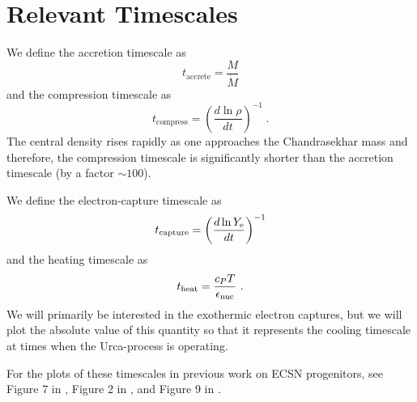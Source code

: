 \documentclass[modern]{aastex62}
\begin{document}


\section{Relevant Timescales}

We define the accretion timescale as
\begin{equation}
  t_{\mathrm{accrete}} = \frac{M}{\dot{M}}
\end{equation}
and the compression timescale as
\begin{equation}
  \label{eq:tcompress}
  t_{\mathrm{compress}} = \left(\frac{d \ln \rho}{dt} \right)^{-1}~.
\end{equation}
The central density rises rapidly as one approaches the Chandrasekhar
mass and therefore, the compression timescale is significantly shorter
than the accretion timescale (by a factor $\sim 100$).


We define the electron-capture timescale as
\begin{equation}
  \label{eq:tcapture}
  t_{\mathrm{capture}} = \left(\frac{d \ln Y_{\rm e}}{dt} \right)^{-1}
\end{equation}
and the heating timescale as
\begin{equation}
  \label{eq:cooling}
  t_{\mathrm{heat}} = \frac{c_P T}{\epsilon_{\mathrm{nuc}}} ~.
\end{equation}
We will primarily be interested in the exothermic electron captures,
but we will plot the absolute value of this quantity so that it
represents the cooling timescale at times when the Urca-process is
operating.


For the plots of these timescales in previous work on ECSN
progenitors, see Figure 7 in \citet{Miyaji1980}, Figure 2 in
\citet{Miyaji1987}, and Figure 9 in \citet{Takahashi2013}.



\end{document}
